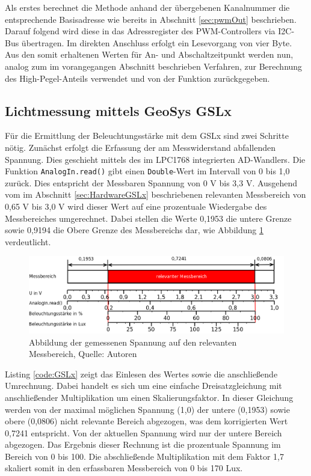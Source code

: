 \documentclass[a4paper,12pt]{scrartcl}
\begin{document}
Als erstes berechnet die Methode anhand der übergebenen Kanalnummer die entsprechende Basisadresse wie bereits in Abschnitt \ref{sec:pwmOut} beschrieben. Darauf folgend wird diese in das Adressregister des PWM-Controllers via I2C-Bus übertragen. Im direkten Anschluss erfolgt ein Lesevorgang von vier Byte. Aus den somit erhaltenen Werten für An- und Abschaltzeitpunkt werden nun, analog zum im vorangegangen Abschnitt beschrieben Verfahren, zur Berechnung des High-Pegel-Anteils verwendet und von der Funktion zurückgegeben.

\subsection{Lichtmessung mittels GeoSys GSLx}
\label{sec:impGSLx}
Für die Ermittlung der Beleuchtungsstärke mit dem GSLx sind zwei Schritte nötig. Zunächst erfolgt die Erfassung der am Messwiderstand abfallenden Spannung. Dies geschieht mittels des im LPC1768 integrierten AD-Wandlers. Die Funktion \texttt{AnalogIn.read()} gibt einen \texttt{Double}-Wert im Intervall von 0 bis 1,0 zurück. Dies entspricht der Messbaren Spannung von 0 V bis 3,3 V. Ausgehend vom im Abschnitt \ref{sec:HardwareGSLx} beschriebenen relevanten Messbereich von 0,65 V bis 3,0 V wird dieser Wert auf eine prozentuale Wiedergabe des Messbereiches umgerechnet. Dabei stellen die Werte 0,1953 die untere Grenze sowie 0,9194 die Obere Grenze des Messbereichs dar, wie Abbildung \ref{fig:geosysScale} verdeutlicht.

\begin{figure}[htb]
\begin{center}
\includegraphics[width=0.9\hsize]{./schematics/geosysScale.png}
\end{center}
\caption{\label{fig:geosysScale}Abbildung der gemessenen Spannung auf den relevanten Messbereich, Quelle: Autoren}
\end{figure}

Listing \ref{code:GSLx} zeigt das Einlesen des Wertes sowie die anschließende Umrechnung. Dabei handelt es sich um eine einfache Dreisatzgleichung mit anschließender Multiplikation um einen Skalierungsfaktor. In dieser Gleichung werden von der maximal möglichen Spannung (1,0) der untere (0,1953) sowie obere (0,0806) nicht relevante Bereich abgezogen, was dem korrigierten Wert 0,7241 entspricht. Von der aktuellen Spannung wird nur der untere Bereich abgezogen. Das Ergebnis dieser Rechnung ist die prozentuale Spannung im Bereich von 0 bis 100. Die abschließende Multiplikation mit dem Faktor 1,7 skaliert somit in den erfassbaren Messbereich von 0 bis 170 Lux.
\end{document}
